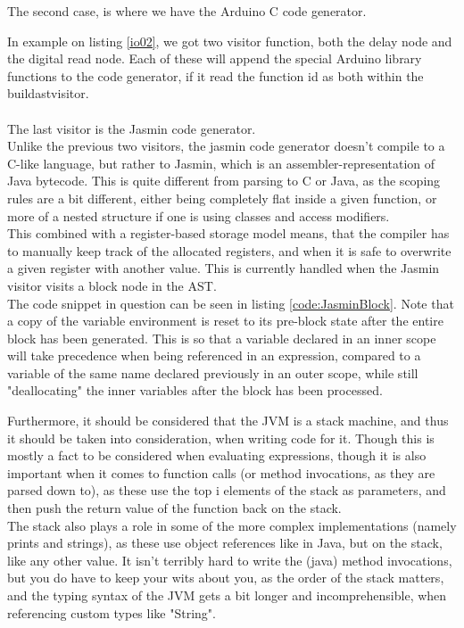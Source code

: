 The second case, is where we have the Arduino C code generator.

\noindent\newline
In example on listing \ref{io02}, we got two visitor function, both the delay node and the digital read node. Each of these will append the special Arduino library functions to the code generator, if it read the function id as both within the buildastvisitor.
\\\\
The last visitor is the Jasmin code generator.\\
Unlike the previous two visitors, the jasmin code generator doesn't compile to a C-like language, but rather to Jasmin, which is an assembler-representation of Java bytecode. This is quite different from parsing to C or Java, as the scoping rules are a bit different, either being completely flat inside a given function, or more of a nested structure if one is using classes and access modifiers.\\
This combined with a register-based storage model means, that the compiler has to manually keep track of the allocated registers, and when it is safe to overwrite a given register with another value. This is currently handled when the Jasmin visitor visits a block node in the AST.\\
The code snippet in question can be seen in listing \ref{code:JasminBlock}. Note that a copy of the variable environment is reset to its pre-block state after the entire block has been generated. This is so that a variable declared in an inner scope will take precedence when being referenced in an expression, compared to a variable of the same name declared previously in an outer scope, while still "deallocating" the inner variables after the block has been processed.


Furthermore, it should be considered that the JVM is a stack machine, and thus it should be taken into consideration, when writing code for it. Though this is mostly a fact to be considered when evaluating expressions, though it is also important when it comes to function calls (or method invocations, as they are parsed down to), as these use the top i elements of the stack as parameters, and then push the return value of the function back on the stack.\\
The stack also plays a role in some of the more complex implementations (namely prints and strings), as these use object references like in Java, but on the stack, like any other value. It isn't terribly hard to write the (java) method invocations, but you do have to keep your wits about you, as the order of the stack matters, and the typing syntax of the JVM gets a bit longer and incomprehensible, when referencing custom types like "String".
